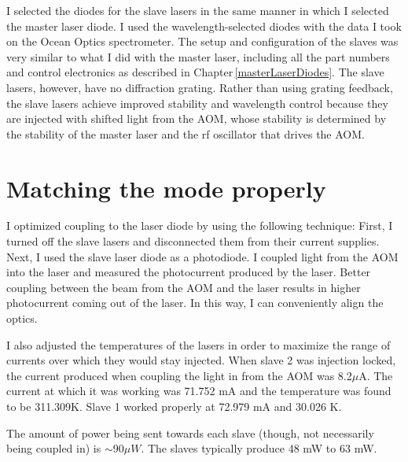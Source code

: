 I selected the diodes for the slave lasers in the same manner in which I selected the master laser diode. I used the wavelength-selected diodes with the data I took on the Ocean Optics spectrometer. The setup and configuration of the slaves was very similar to what I did with the master laser, including all the part numbers and control electronics as described in Chapter\,\ref{masterLaserDiodes}. The slave lasers, however, have no diffraction grating. Rather than using grating feedback, the slave lasers achieve improved stability and wavelength control because they are injected with shifted light from the AOM, whose stability is determined by the stability of the master laser and the rf oscillator that drives the AOM. 




\section{Matching the mode properly}
I optimized coupling to the laser diode by using the following technique: First, I turned off the slave lasers and disconnected them from their current supplies. Next, I used the slave laser diode as a photodiode. I coupled light from the AOM into the laser and measured the photocurrent produced by the laser. Better coupling between the beam from the AOM and the laser results in higher photocurrent coming out of the laser. In this way, I can conveniently align the optics. 

I also adjusted the temperatures of the lasers in order to maximize the range of currents over which they would stay injected. 
When slave 2 was injection locked, the current produced when coupling the light in from the AOM was 8.2$\mu$A. The current at which it was working was 71.752 mA %
and the temperature was found to be 311.309K. %
Slave 1 worked properly at 72.979 mA and 30.026 K.

The amount of power being sent towards each slave (though, not necessarily being coupled in) is $\sim$90$\mu W$. The slaves typically produce 48 mW to 63 mW.
